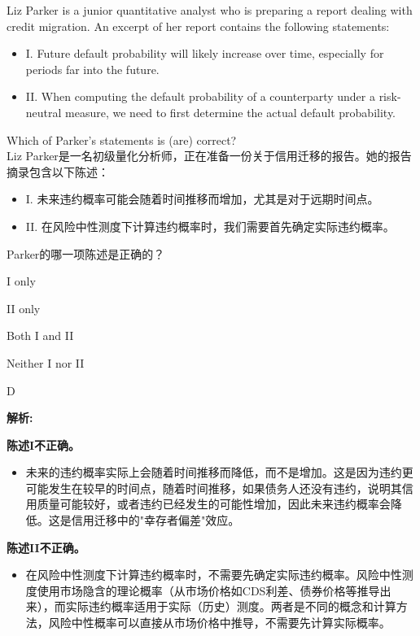 \documentclass{article}
\newcounter{question} %
\newenvironment{explanation}
{\textbf{解析:}\par}
{\par}
\begin{document}
\begin{question}
    Liz Parker is a junior quantitative analyst who is preparing a report dealing with credit migration. An excerpt of her report contains the following statements:
    \begin{itemize}
    \item I. Future default probability will likely increase over time, especially for periods far into the future.
    \item II. When computing the default probability of a counterparty under a risk-neutral measure, we need to first determine the actual default probability.
    \end{itemize}
    Which of Parker's statements is (are) correct?
    \\ Liz Parker是一名初级量化分析师，正在准备一份关于信用迁移的报告。她的报告摘录包含以下陈述：
    \begin{itemize}
    \item I. 未来违约概率可能会随着时间推移而增加，尤其是对于远期时间点。
    \item II. 在风险中性测度下计算违约概率时，我们需要首先确定实际违约概率。
    \end{itemize}
    Parker的哪一项陈述是正确的？
\end{question}

\begin{choices}
    \item I only
    \item II only
    \item Both I and II
    \item Neither I nor II
\end{choices}

\begin{correctanswer}
    D
\end{correctanswer}

\begin{explanation}
    \textbf{陈述I不正确。}
    \begin{itemize}
        \item 未来的违约概率实际上会随着时间推移而降低，而不是增加。这是因为违约更可能发生在较早的时间点，随着时间推移，如果债务人还没有违约，说明其信用质量可能较好，或者违约已经发生的可能性增加，因此未来违约概率会降低。这是信用迁移中的"幸存者偏差"效应。
    \end{itemize}

    \textbf{陈述II不正确。}
    \begin{itemize}
        \item 在风险中性测度下计算违约概率时，不需要先确定实际违约概率。风险中性测度使用市场隐含的理论概率（从市场价格如CDS利差、债券价格等推导出来），而实际违约概率适用于实际（历史）测度。两者是不同的概念和计算方法，风险中性概率可以直接从市场价格中推导，不需要先计算实际概率。
    \end{itemize}
\end{explanation}
\end{document}
